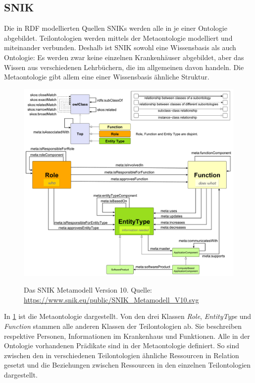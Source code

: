 \documentclass[utf8,biblatex]{lni}
\begin{document}
\subsection{SNIK}

Die in RDF modellierten Quellen SNIKs werden alle in je einer Ontologie abgebildet.
Teilontologien werden mittels der Metaontologie modelliert und miteinander verbunden.
Deshalb ist SNIK sowohl eine Wissensbasis als auch Ontologie:
Es werden zwar keine einzelnen Krankenhäuser abgebildet, aber das Wissen aus verschiedenen Lehrbüchern, die im allgemeinen davon handeln.
Die Metaontologie gibt allem eine einer Wissensbasis ähnliche Struktur.

\begin{figure}[h]
  \includegraphics[width=\linewidth]{../Dokumentation/Images/snik-metamodel-V10.pdf}\label{fig:snik-metamodel}
  \caption[SNIK Metamodell Version 10]{Das SNIK Metamodell Version 10. Quelle: \url{https://www.snik.eu/public/SNIK_Metamodell_V10.svg}}
\end{figure}
In \cref{fig:snik-metamodel} ist die Metaontologie dargestellt.
Von den drei Klassen \emph{Role}, \emph{EntityType} und \emph{Function} stammen alle anderen Klassen der Teilontologien ab.
Sie beschreiben respektive Personen, Informationen im Krankenhaus und Funktionen.
Alle in der Ontologie vorhandenen Prädikate sind in der Metaontologie definiert.
So sind zwischen den in verschiedenen Teilontologien ähnliche Ressourcen in Relation gesetzt und die Beziehungen zwischen Ressourcen in den einzelnen Teilontologien dargestellt.
\end{document}
